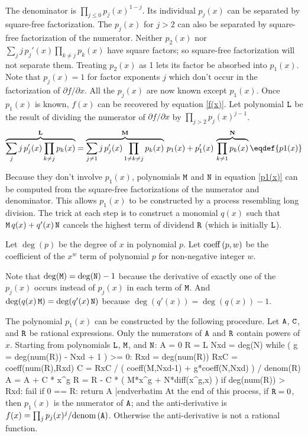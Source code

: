 The denominator is $\prod_{j\le0} p_j(x)^{1-j}$.  Its individual
$p_j(x)$ can be separated by square-free factorization.  The $p_j(x)$
for $j>2$ can also be separated by square-free factorization of the
numerator.  Neither $p_2(x)$ nor
${\sum_{j}j\,{p_j'}(x)\prod_{k\neq{j}}p_k(x)}$ have square factors; so
square-free factorization will not separate them.  Treating $p_2(x)$
as 1 lets its factor be absorbed into $p_1(x)$.  Note that $p_j(x)=1$
for factor exponents $j$ which don't occur in the factorization of
$\partial{f}/\partial{x}$.  All the $p_j(x)$ are now known except $p_1(x)$.  Once
$p_1(x)$ is known, $f(x)$ can be recovered by equation \eqref{f(x)}.
Let polynomial ${\tt{L}}$ be the result of dividing the numerator of
$\partial{f}/\partial{x}$ by $\prod_{j>2}p_j(x)^{j-1}$.
$$\overbrace{\sum_{j}j\,{p_j'}(x)\prod_{k\neq j} p_k(x)}^{\bf L}=
  \overbrace{\sum_{j\ne1}j\,{p_j'}(x)\prod_{1\neq k\neq j}p_k(x)}^{{\bf M}}\,p_1(x)
  +{p_1'}(x)\,\overbrace{\prod_{k\neq1}p_k(x)}^{{\bf N}}\eqdef{p1(x)}$$

Because they don't involve $p_1(x)$, polynomials ${\tt{M}}$ and
${\tt{N}}$ in equation \eqref{p1(x)} can be computed from the
square-free factorizations of the numerator and denominator.  This
allows $p_1(x)$ to be constructed by a process resembling long
division.  The trick at each step is to construct a monomial $q(x)$
such that ${\tt{M}}\,q(x)+q'(x)\,{\tt{N}}$ cancels the highest term of
dividend ${\tt{R}}$ (which is initially ${\tt{L}}$).

Let $\deg(p)$ be the degree of $x$ in polynomial $p$.  Let
${\rm coeff}\,(p,w)$ be the coefficient of the $x^w$ term of polynomial $p$
for non-negative integer $w$.

Note that $\deg({\tt{M}})=\deg({\tt{N}})-1$ because the
derivative of exactly one of the $p_j(x)$ occurs instead of $p_j(x)$
in each term of ${\tt{M}}$.  And
$\deg(q(x)\,{\tt{M}})=\deg(q'(x)\,{\tt{N}})$ because
$\deg(q'(x))=\deg(q(x))-1$.

The polynomial $p_1(x)$ can be constructed by the following procedure.
Let ${\tt{A}}$, ${\tt{C}}$, and ${\tt{R}}$ be rational expressions.
Only the numerators of ${\tt{A}}$ and ${\tt{R}}$ contain powers of
$x$.  Starting from polynomials ${\tt{L}}$, ${\tt{M}}$, and
${\tt{N}}$:
\medskip
\verbatim
A = 0
R = L
Nxd = deg(N)
while ( g = deg(num(R)) - Nxd + 1 ) >= 0:
    Rxd = deg(num(R))
    RxC = coeff(num(R),Rxd)
    C = RxC / ( coeff(M,Nxd-1) + g*coeff(N,Nxd) ) / denom(R)
    A = A + C * x^g
    R = R - C * ( M*x^g + N*diff(x^g,x) )
    if deg(num(R)) > Rxd:
        fail
    if 0 == R:
        return A
|endverbatim
\medskip
At the end of this process, if ${\tt{R}}=0$, then $p_1(x)$ is the
numerator of ${\tt{A}}$; and the anti-derivative is
$f(x)=\prod_j{p_j(x)^j}/{\rm denom}\,({\tt{A}})$.  Otherwise the
anti-derivative is not a rational function.

